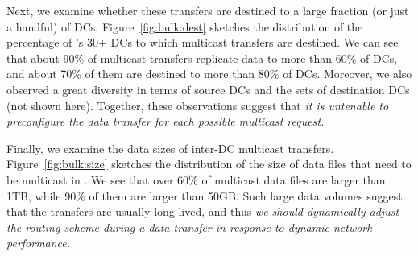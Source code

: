 Next, we examine whether these transfers are destined to
a large fraction (or just a handful) of DCs.
Figure~\ref{fig:bulk:dest} sketches the distribution of the
percentage of \company's 30+ DCs to which multicast
transfers are destined.
We can see that about 90\% of multicast transfers replicate data
to more than 60\% of DCs, and about 70\% of them are destined
to more than 80\% of DCs.
Moreover, we also observed a great diversity  in terms of
source DCs and the sets of destination DCs (not shown here).
Together, these observations suggest that {\em it is untenable
to preconfigure the data transfer for each possible multicast
request.}


Finally, we examine the data sizes of inter-DC
multicast transfers.
Figure~\ref{fig:bulk:size} sketches the distribution of the
size of data files that need to be multicast in \company.
We see that over 60\% of multicast data files are larger than 1TB,
while 90\% of them are larger than 50GB.
Such large data volumes suggest that the transfers are usually
long-lived, and thus {\em we should dynamically adjust
the routing scheme during a data transfer in response to
dynamic network performance.}


